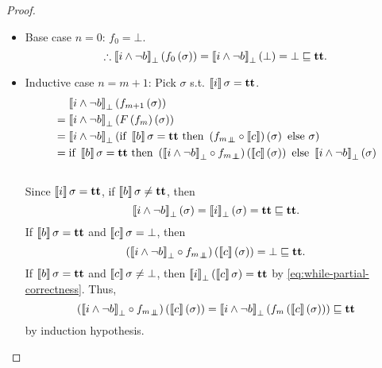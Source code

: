 \begin{proof}
	\begin{itemize}
		\item
		      Base case $n = 0$: $f_0 = \bot$.
		      \[
			      \therefore
			      \left\llbracket i \wedge \neg b \right\rrbracket_\bot \left( f_0 \left( \sigma \right) \right) = \left\llbracket i \wedge \neg b \right\rrbracket_\bot \left( \bot \right) = \bot \sqsubseteq \textbf{tt}.
		      \]
		\item
		      Inductive case $n = m + 1$:
		      Pick $\sigma$ s.t. $\left\llbracket i \right\rrbracket \sigma = \textbf{tt}$.
		      \begin{align*}
			       & \quad\, \left\llbracket i \wedge \neg b \right\rrbracket_\bot \left( f_{m + 1} \left( \sigma \right) \right)                                    \\
			       & = \left\llbracket i \wedge \neg b \right\rrbracket_\bot \left( F\left( f_m \right) \left( \sigma \right) \right)                                       \\
			       & = \left\llbracket i \wedge \neg b \right\rrbracket_\bot
			      \left( \textrm{if } \left\llbracket b \right\rrbracket \sigma = \textbf{tt} \textrm{ then } \left(  {f_m}_{\bot \mkern-11mu \bot} \circ \left\llbracket c \right\rrbracket \right) \left( \sigma \right) \textrm{ else } \sigma \right) \\
			       & = \textrm{if } \left\llbracket b \right\rrbracket \sigma = \textbf{tt} \textrm{ then } \left( \left\llbracket i \wedge \neg b \right\rrbracket_\bot \circ {f_m}_{\bot \mkern-11mu \bot} \right) \left( \left\llbracket c \right\rrbracket \left( \sigma \right) \right) \textrm{ else } \left\llbracket i \wedge \neg b \right\rrbracket_\bot \left( \sigma \right)                                                               \\
		      \end{align*}
		      \vspace{-3em}\\
		      Since $\left\llbracket i \right\rrbracket \sigma = \textbf{tt}$, if $\left\llbracket b \right\rrbracket \sigma \ne \textbf{tt}$, then
		      \[
			      \left\llbracket i \wedge \neg b \right\rrbracket_\bot \left( \sigma \right) = \left\llbracket i \right\rrbracket_\bot \left( \sigma \right) = \textbf{tt} \sqsubseteq \textbf{tt}.
		      \]
		      If $\left\llbracket b \right\rrbracket \sigma = \textbf{tt}$ and $\left\llbracket c \right\rrbracket \sigma = \bot$, then
		      \[
			      \left( \left\llbracket i \wedge \neg b \right\rrbracket_\bot \circ {f_m}_{\bot \mkern-11mu \bot} \right) \left( \left\llbracket c \right\rrbracket \left( \sigma \right) \right) = \bot \sqsubseteq \textbf{tt}.
		      \]
		      If $\left\llbracket b \right\rrbracket \sigma = \textbf{tt}$ and $\left\llbracket c \right\rrbracket \sigma \ne \bot$, then
		      $\left\llbracket i \right\rrbracket_\bot \left( \left\llbracket c \right\rrbracket\sigma \right) = \textbf{tt}$
		      by \cref{eq:while-partial-correctness}.
		      Thus,
		      \[
			      \left( \left\llbracket i \wedge \neg b \right\rrbracket_\bot \circ {f_m}_{\bot \mkern-11mu \bot} \right) \left( \left\llbracket c \right\rrbracket \left( \sigma \right) \right) =
			      \left\llbracket i \wedge \neg b \right\rrbracket_\bot \left(  f_m \left( \left\llbracket c \right\rrbracket \left( \sigma \right) \right)  \right) \sqsubseteq \textbf{tt}
		      \]
		      by induction hypothesis.
	\end{itemize}

\end{proof}

